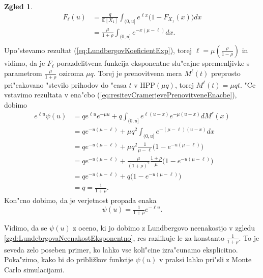 \documentclass[12pt, a4paper, reqno]{amsart}
\theoremstyle{definition}
\newtheorem{zgled}[definicija]{Zgled}
\theoremstyle{plain}
\newcommand{\E}{\mathbb{E}}
\newcommand{\1}{\mathds{1}}
\begin{document}
\begin{zgled}
                \begin{align*}
                    F_\ell(u)  &= \frac{q}{\E\left[X_1\right]}\int_{(0, u]}e^{\ell x}\bigl(1 - F_{X_1}(x)\bigr)dx \\
                            &= \frac{\mu}{1 + \rho}\int_{(0, u]}e^{-x(\mu - \ell)}dx. \\
                \end{align*}
                Upo"stevamo rezultat (\ref{eq:LundbergovKoeficientExp}), torej 
                $\ell = \mu\left(\tfrac{\rho}{1 - \rho}\right)$ in vidimo, da je $F_\ell$ porazdelitvena 
                funkcija eksponentne slu"cajne spremenljivke s parametrom $\frac{\mu}{1 + \rho}$ oziroma 
                $\mu q$. Torej je prenovitvena mera $M^\ell(t)$ preprosto pri"cakovano "stevilo prihodov do 
                "casa $t$ v $\text{HPP}(\mu q)$, torej $M^\ell(t) = \mu qt$.
                "Ce vstavimo rezultata v ena"cbo (\ref{eq:resitevCramerjevePrenovitveneEnacbe}), dobimo
                \begin{align*}
                    e^{\ell u}\psi(u)   &= qe^{\ell u}e^{-\mu u} + q\int_{(0, u]}e^{\ell(u - x)}e^{-\mu(u - x)}dM^\ell(x)\\
                                        &= qe^{-u(\mu - \ell)} + \mu q^2\int_{(0, u]}e^{-(\mu - \ell)(u - x)}dx \\
                                        &= qe^{-u(\mu - \ell)} + \mu q^2 \frac{1}{\mu - \ell}\biggl(1 - e^{-u(\mu - \ell)}\biggr)\\
                                        &= qe^{-u(\mu - \ell)} + \frac{\mu}{(1 + \rho)^2}\frac{1 + \rho}{\mu}\biggl(1 - e^{-u(\mu - \ell)}\biggr) \\
                                        &= qe^{-u(\mu - \ell)} + q\biggl(1 - e^{-u(\mu - \ell)}\biggr) \\
                                        &= q = \frac{1}{1 + \rho}.
                \end{align*}
                Kon"cno dobimo, da je verjetnost propada enaka
                \begin{equation}
                    \psi(u) =  \tfrac{1}{1+\rho}e^{-\ell u}.
                \label{eq:eksplicitnaVerjetnostPropadaExp}
                \end{equation}
            \end{zgled}

                Vidimo, da se $\psi(u)$ z oceno, ki jo dobimo z Lundbergovo neenakostjo v zgledu \ref{zgd:LundebrgovaNeenakostEksponentno}, 
                res razlikuje le za konstanto $\tfrac{1}{1 + \rho}$.
                To je seveda zelo poseben primer, ko lahko vse koli"cine izra"cunamo eksplicitno.
                Poka"zimo, kako bi do približkov funkcije $\psi(u)$ v praksi lahko pri"sli z Monte 
                Carlo simulacijami.
            
\end{document}
